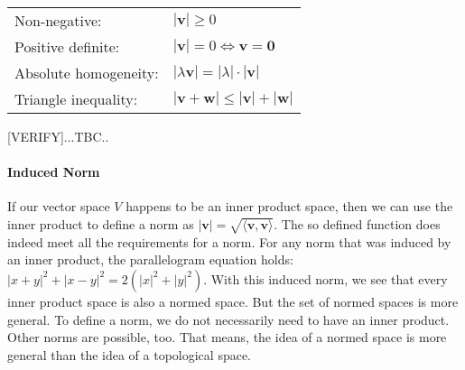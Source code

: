 \medskip
\begin{tabular}{l l}
Non-negative:         & $|\mathbf{v}| \geq 0$  \\
Positive definite:    & $|\mathbf{v}| = 0 \Leftrightarrow \mathbf{v} = \mathbf{0}$  \\
Absolute homogeneity: & $|\lambda \mathbf{v}| = |\lambda| \cdot |\mathbf{v}|$  \\
Triangle inequality:  & $|\mathbf{v} + \mathbf{w}| \leq |\mathbf{v}| + |\mathbf{w}|$
\end{tabular}
\medskip

[VERIFY]...TBC..


\paragraph{Induced Norm}
If our vector space $V$ happens to be an inner product space, then we can use the inner product to define a norm as $|\mathbf{v}| = \sqrt{\langle \mathbf{v,v}  \rangle}$. The so defined function does indeed meet all the requirements for a norm. For any norm that was induced by an inner product, the parallelogram equation holds: $|x+y|^2 + |x-y|^2 = 2(|x|^2 + |y|^2)$. With this induced norm, we see that every inner product space is also a normed space. But the set of normed spaces is more general. To define a norm, we do not necessarily need to have an inner product. Other norms are possible, too. That means, the idea of a normed space is more general than the idea of a topological space.





